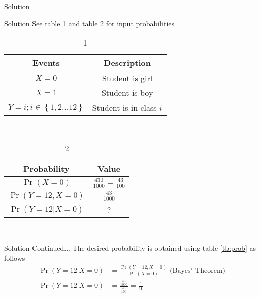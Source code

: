 \documentclass{beamer}
\providecommand{\pr}[1]{\ensuremath{\Pr\left(#1\right)}}
\providecommand{\cbrak}[1]{\ensuremath{\left\{#1\right\}}}
\begin{document}
    \begin{frame}
        \begin{section}{Solution}
            \begin{block}{Solution}
                See table \ref{tb:desc} and table \ref{tb:prob} for input probabilities
    
                \begin{table}[h]
                    \begin{tabular}{|c|c|}
                        \hline
                        Events & Description\\
                        \hline
                        $X=0$ & Student is girl\\
                        \hline
                        $X=1$ & Student is boy\\
                        \hline
                        $Y=i; i\in\cbrak{1, 2... 12}$ & Student is in class $i$\\
                        \hline
                    \end{tabular}\\
                    \caption{1}
                    \label{tb:desc}
                \end{table}
                \begin{table}[h]
                    \begin{tabular}{|c|c|}
                        \hline
                        Probability & Value\\
                        \hline
                        $\pr{X=0}$ & $\frac{430}{1000} = \frac{43}{100}$\\
                        \hline
                        $\pr{Y=12, X=0}$ & $\frac{43}{1000}$\\
                        \hline
                        $\pr{Y=12 | X=0}$ & ?\\
                        \hline
                    \end{tabular}\\
                    \caption{2}
                    \label{tb:prob}
                \end{table}
            \end{block}
        \end{section}

    \end{frame}
    \begin{frame}
        \begin{block}{Solution Continued...}
            The desired probability is obtained using table \autoref{tb:prob} as follows
            \begin{align}
                \pr{Y=12 | X=0} &= \frac{\pr{Y=12, X=0}}{\pr{X=0}} \text{ (Bayes' Theorem)}\\
                \pr{Y=12 | X=0} &= \frac{\frac{43}{1000}}{\frac{43}{100}} = \frac{1}{10}
            \end{align}
        \end{block}
    \end{frame}
\end{document}
